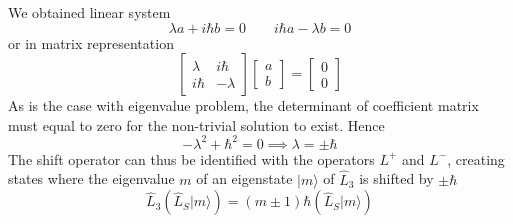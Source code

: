 \documentclass[../../../main.tex]{subfiles}
\begin{document}
We obtained linear system
\begin{equation*}
    \lambda a + i \hbar b =0 \qquad
    i \hbar a - \lambda b   =0
\end{equation*}
or in matrix representation
\begin{equation*}
    \begin{bmatrix}
        \lambda & i \hbar  \\
        i \hbar & -\lambda
    \end{bmatrix}
    \begin{bmatrix}
        a \\
        b
    \end{bmatrix}
    =
    \begin{bmatrix}
        0 \\
        0
    \end{bmatrix}
\end{equation*}
As is the case with eigenvalue problem, the determinant of coefficient matrix must equal to zero for the non-trivial solution to exist.
Hence
\begin{equation*}
    -\lambda^2+\hbar ^2=0\implies \lambda=\pm \hbar
\end{equation*}
The shift operator can thus be identified with the operators $L^+$ and $L^-$, creating states where the eigenvalue $m$ of an eigenstate $|m\rangle$ of $\hat{L}_3$ is shifted by $\pm \hbar $
\begin{equation*}
    \hat{L}_3 (\hat{L}_S |m\rangle) = (m \pm 1)\hbar  (\hat{L}_S |m\rangle)
\end{equation*}
\end{document}
